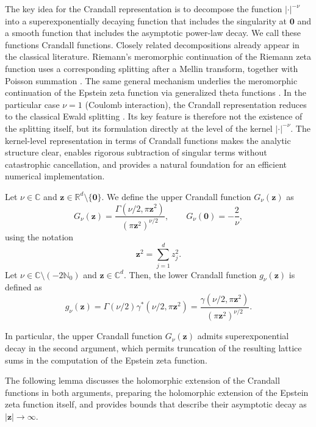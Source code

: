 \documentclass[]{amsart}
\newcommand{\new}[1]{#1}
\numberwithin{mythm}{section}
\begin{document}
The key idea for the Crandall representation is to decompose the function $\vert  \bm \cdot\vert^{-\nu}$ into a superexponentially decaying function that includes the singularity at $\bm 0$ and a smooth function that includes the asymptotic power-law decay. We call these functions Crandall functions.
\new{Closely related decompositions already appear in the classical literature. Riemann's meromorphic continuation of the Riemann zeta function uses a corresponding splitting after a Mellin transform, together with Poisson summation \cite{riemann}. The same general mechanism underlies the meromorphic continuation of the Epstein zeta function via generalized theta functions \cite{epstein1903theorieI,epstein1903theorieII}. In the particular case $\nu=1$ (Coulomb interaction), the Crandall representation reduces to the classical Ewald splitting \cite{ewald1921berechnung}. Its key feature is therefore not the existence of the splitting itself, but its formulation directly at the level of the kernel $\vert \bm\cdot\vert^{-\nu}$. The kernel-level representation in terms of Crandall functions makes the analytic structure clear, enables rigorous subtraction of singular terms without catastrophic cancellation, and provides a natural foundation for an efficient numerical implementation.}


\begin{definition}
\label{defCrandallFuncs}
Let $\nu\in\mathds C$ and $\bm z\in\mathds R^d\setminus\{\bm 0\}$.
We define the upper Crandall function $G_{\nu}(\bm z)$ as
$$
G_{\nu}(\bm{z})= 
	\frac{\Gamma(\nu/2,\pi \bm{z}^2)}{(\pi \bm{z}^2)^{\nu/2}}
,\qquad G_{\nu}(\bm 0)
=-\frac{2}{\nu},
$$
\new{using the notation
\[\bm{z}^2=\sum_{j=1}^d z_j^2.
\]}
Let $\nu\in\mathds C\setminus(-2\mathds N_0)$ and $\bm z\in \mathds C^d$. Then, the lower Crandall function $g_{\nu}(\bm z)$ is defined as
$$
g_{\nu}(\bm z)=
\Gamma(\nu/2) \gamma^*(\nu/2,\pi \bm z^2)= \frac{\gamma(\nu/2,\pi \bm{z}^2)}{(\pi \bm{z}^2)^{\nu/2}} .
$$
\end{definition}


In particular, the upper Crandall function $G_{\nu}(\bm z)$ admits superexponential decay in the second argument,
which permits truncation of the resulting lattice sums in the computation of the Epstein zeta function.

The following lemma discusses the \new{holomorphic extension} of the Crandall functions in both arguments, \new{preparing the holomorphic extension of the Epstein zeta function itself,} and provides bounds that describe their asymptotic decay as $\vert \bm z\vert\to \infty$.
\end{document}
